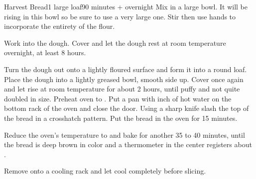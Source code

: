 \documentclass[../Cookbook.tex]{subfiles}
\begin{document}
\begin{recipe}[HarvestBread]{Harvest Bread}{1 large loaf}{90 minutes + overnight}
Mix in a large bowl.
It will be rising in this bowl so be sure to use a very large one.
Stir then use hands to incorporate the entirety of the flour.

Work into the dough.
Cover and let the dough rest at room temperature overnight, at least 8 hours.

Turn the dough out onto a lightly floured surface and form it into a round loaf.
Place the dough into a lightly greased bowl, smooth side up.
Cover once again and let rise at room temperature for about 2 hours, until puffy and not quite doubled in size.
Preheat oven to .
Put a pan with  inch of hot water on the bottom rack of the oven and close the door.
Using a sharp knife slash the top of the bread in a crosshatch pattern.
Put the bread in the oven for 15 minutes.

Reduce the oven's temperature to  and bake for another 35 to 40 minutes, until the bread is deep brown in color and a thermometer in the center registers about .

Remove onto a cooling rack and let cool completely before slicing.
\end{recipe}
\end{document}
